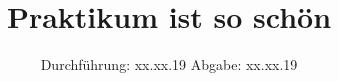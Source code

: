 

\subject{Vxxx}
\title{Praktikum ist so schön}
\date{
  Durchführung: xx.xx.19
  \hspace{3em}
  Abgabe: xx.xx.19
}



\maketitle
\thispagestyle{empty}
\tableofcontents
\newpage




%



\newpage
\printbibliography


